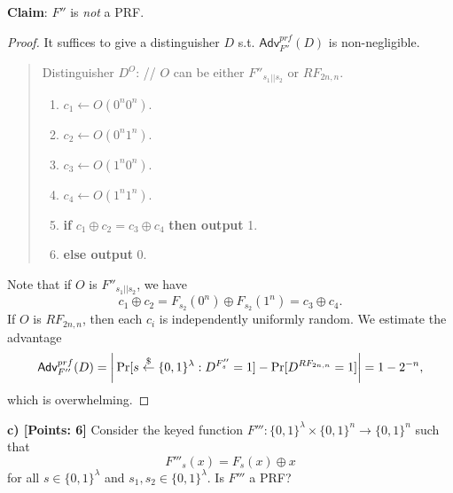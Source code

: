 \documentclass[12pt]{article}
\newcommand{\bits}{\{0,1\}}
\newcommand{\getsr}{\stackrel{\$}{\gets}}
\newcommand{\Adv}{\textsf{Adv}}
\theoremstyle{definition}
\begin{document}
{\bf Claim}: $F''$ is \emph{not} a PRF.
\begin{proof}
It suffices to give a distinguisher $D$ s.t. $\Adv_{F''}^{prf}(D)$ is non-negligible.
\begin{quote}
Distinguisher $D^O$: // $O$ can be either $F''_{s_1||s_2}$ or $RF_{2n,n}$.
\begin{enumerate}
\item $c_1 \gets O(0^n0^n)$.
\item $c_2 \gets O(0^n1^n)$.
\item $c_3 \gets O(1^n0^n)$.
\item $c_4 \gets O(1^n1^n)$.
\item {\bf if} $c_1 \oplus c_2 = c_3 \oplus c_4$ {\bf then output} 1.
\item {\bf else output} 0.
\end{enumerate}
\end{quote}
Note that if $O$ is $F''_{s_1||s_2}$, we have
$$c_1 \oplus c_2 = F_{s_2}(0^n) \oplus F_{s_2}(1^n) = c_3 \oplus c_4.$$
If $O$ is $RF_{2n,n}$, then each $c_i$ is independently uniformly random.
We estimate the advantage
$$
\Adv_{F''}^{prf}(D) 
= \bigg| \Pr[s \getsr \bits^\lambda : D^{F''_s}=1] - \Pr[D^{RF_{2n,n}}=1] \bigg| \\
= 1 - 2^{-n},
$$
which is overwhelming.
\end{proof}

{\bf c) [Points: 6]} Consider the keyed function $F''' : \bits^\lambda \times \bits^n \to \bits^n$ such that
$$F'''_s(x) = F_s(x) \oplus x$$
for all $s \in \bits^\lambda$ and $s_1, s_2 \in \bits^\lambda$. Is $F'''$ a PRF?
\end{document}
